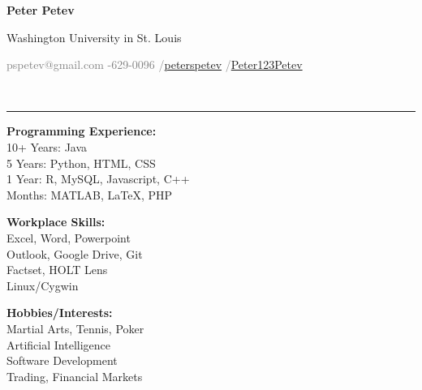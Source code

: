 \documentclass[11pt]{article}
\begin{document}
	\begin{titlepage}
		\small
			\begin{center}
				\centerline{{\Large \textbf{Peter Petev}}}
				\centerline{Washington University in St. Louis}
				\small
				\begin{minipage}[b]{\textwidth}
					\textcolor{gray}{\faEnvelope \space pspetev@gmail.com}\hfill
					\textcolor{gray}{\faMobilePhone {}-629-0096}\hfill
					\textcolor{gray}{\faLinkedinSquare \slash \href{http://www.linkedin.com/in/peterspetev}{peterspetev}}\hfill
					\textcolor{gray}{\faGithubSquare \slash \href{http://www.github.com/Peter123Petev}{Peter123Petev}}
				\end{minipage}
			\end{center}
		\vspace{-15pt}
		\noindent\makebox[\linewidth]{\rule{\paperwidth}{0.4pt}}\vspace{5pt}
		\\\rule{\textwidth}{0.4pt}
		\begin{addmargin}[1em]{0em}
			\vspace{-10pt}
			\begin{center}
				\begin{minipage}[b]{0.4\textwidth}
					\textbf{Programming Experience:}\\ 10+ Years: Java\\ 5 Years: Python, HTML, CSS\\ 1 Year: R, MySQL, Javascript, C++\\Months: MATLAB, \LaTeX, PHP\\
				\end{minipage}%
				\begin{minipage}[b]{0.3\textwidth}
					\textbf{Workplace Skills:}\\ Excel, Word, Powerpoint\\ Outlook, Google Drive, Git\\ Factset, HOLT Lens\\Linux/Cygwin\\
				\end{minipage}%
				\begin{minipage}[b]{0.3\textwidth}
					\textbf{Hobbies/Interests:}\\ Martial Arts, Tennis, Poker\\ Artificial Intelligence\\ Software Development\\ Trading, Financial Markets\\

\end{minipage}
\end{center}
\end{addmargin}
\end{titlepage}
\end{document}

